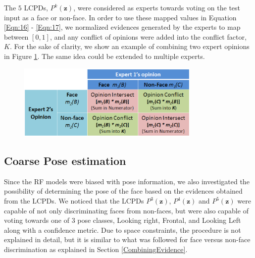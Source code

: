 \documentclass[times, 10pt,twocolumn]{article}
\begin{document}
The $5$ LCPDs, $P^k(\mathbf z)$, were considered as experts towards
voting on the test input as a face or non-face. In order to use
these mapped values in Equation \ref{Eqn:16} - \ref{Eqn:17}, we
normalized evidences generated by the experts to map between
$[0,1]$, and any conflict of opinions were added into the conflict
factor, $K$. For the sake of clarity, we show an example of
combining two expert opinions in Figure \ref{Fig:DST}. The same idea
could be extended to multiple experts.
\begin{figure}[h]
\centering
\hspace{-0.2in}\includegraphics[width=3.5in]{Figure12.eps}
\caption{{\bf {\selectfont }}} \label{Fig:DST}
\end{figure}

\subsection{Coarse Pose estimation}\label{CoarsePoseEstimation}
Since the RF models were biased with pose information, we also
investigated the possibility of determining the pose of the face
based on the evidences obtained from the LCPDs. We noticed that the
LCPDs $P^3(\mathbf z)$, $P^4(\mathbf z)$ and $P^5(\mathbf z)$ were
capable of not only discriminating faces from non-faces, but were
also capable of voting towards one of $3$ pose classes, Looking
right, Frontal, and Looking Left along with a confidence metric. Due
to space constraints, the procedure is not explained in detail, but
it is similar to what was followed for face versus non-face
discrimination as explained in Section \ref{CombiningEvidence}.
\end{document}
